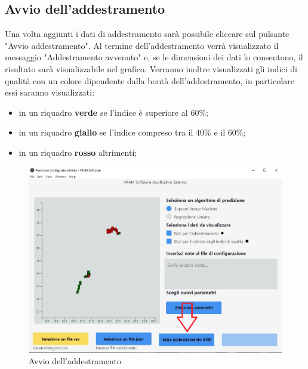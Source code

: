 	\subsection{Avvio dell'addestramento}
	Una volta aggiunti i dati di addestramento sarà possibile cliccare sul pulsante "Avvio addestramento". Al termine dell'addestramento verrà visualizzato il messaggio "Addestramento avvenuto" e, se le dimensioni dei dati lo consentono, il risultato sarà visualizzabile nel grafico. Verranno inoltre visualizzati gli indici di qualità con un colore dipendente dalla bontà dell'addestramento, in particolare essi saranno visualizzati:
	\begin{itemize}
		\item in un riquadro \textbf{verde} se l'indice è superiore al 60\%;
		\item in un riquadro \textbf{giallo} se l'indice compreso tra il 40\% e il 60\%;
		\item in un riquadro \textbf{rosso} altrimenti;
	\end{itemize}
	\begin{figure}[H] 	
		\begin{center}
			\includegraphics[width=\linewidth]{img/4.png}
		\end{center}
		\caption{Avvio dell'addestramento}	
	\end{figure}
